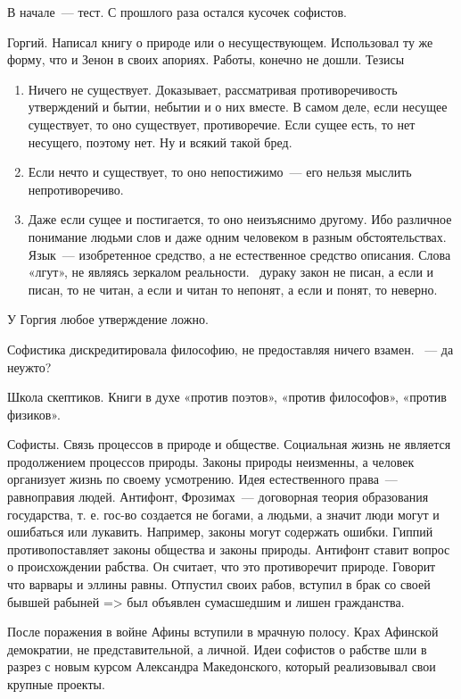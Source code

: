 В начале~--- тест. 
С прошлого раза остался кусочек софистов. 

Горгий.
Написал книгу о природе или о несуществующем. Использовал ту же форму, что и Зенон в своих апориях. Работы, конечно не дошли. 
Тезисы

\begin{enumerate}
	\item Ничего не существует. Доказывает, рассматривая противоречивость утверждений и бытии, небытии и о них вместе. 
	В самом деле, если несущее существует, то оно существует, противоречие. Если сущее есть, то нет несущего, поэтому нет. Ну и всякий такой бред. 
	\item Если нечто и существует, то оно непостижимо~--- его нельзя мыслить непротиворечиво. 
	\item Даже если сущее и постигается, то оно неизъяснимо другому. Ибо различное понимание людьми слов и даже одним человеком в разным обстоятельствах. 
	Язык~--- изобретенное средство, а не естественное средство описания. Слова «лгут», не являясь зеркалом реальности. ~дураку закон не писан, а если и писан, то не читан, а если и читан то непонят, а если и понят, то неверно. 
\end{enumerate}

У Горгия любое утверждение ложно. 

Софистика дискредитировала философию, не предоставляя ничего взамен. ~--- да неужто?

Школа скептиков. Книги в духе «против поэтов», «против философов», «против физиков». 

Софисты. 
Связь процессов в природе и обществе. Социальная жизнь не является продолжением процессов природы. Законы природы неизменны, а человек организует жизнь по своему усмотрению. 
Идея естественного права~--- равноправия людей. Антифонт, Фрозимах~--- договорная теория образования государства, т. е. гос-во создается не богами, а людьми, а значит люди могут и ошибаться или лукавить. Например, законы могут содержать ошибки. 
Гиппий противопоставляет законы общества и законы природы. Антифонт ставит вопрос о происхождении рабства. 
Он считает, что это противоречит природе. Говорит что варвары и эллины равны. 
Отпустил своих рабов, вступил в брак со своей бывшей рабыней => был объявлен сумасшедшим и лишен гражданства. 

После поражения в войне Афины вступили в мрачную полосу. Крах Афинской демократии, не представительной, а личной. Идеи софистов о рабстве шли в разрез с новым курсом Александра Македонского, который реализовывал свои крупные проекты. 

